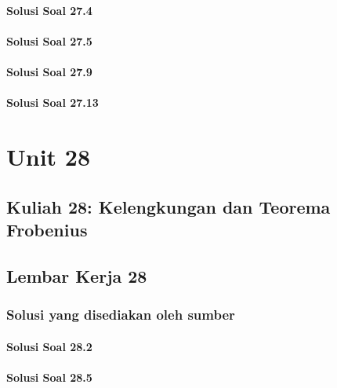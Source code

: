\documentclass[11pt,a4paper,oneside]{book}
\begin{document}
\subsection*{Solusi Soal 27.4}

\subsection*{Solusi Soal 27.5}

\subsection*{Solusi Soal 27.9}

\subsection*{Solusi Soal 27.13}


\part{Unit 28}
\chapter[Kuliah 28]{Kuliah 28: Kelengkungan dan Teorema Frobenius}


\chapter{Lembar Kerja 28}


\section*{Solusi yang disediakan oleh sumber}
\subsection*{Solusi Soal 28.2}

\subsection*{Solusi Soal 28.5}

\end{document}
